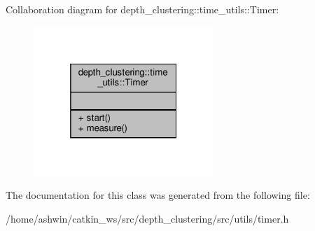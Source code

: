 Collaboration diagram for depth\+\_\+clustering\+:\+:time\+\_\+utils\+:\+:Timer\+:\nopagebreak
\begin{figure}[H]
\begin{center}
\leavevmode
\includegraphics[width=193pt]{classdepth__clustering_1_1time__utils_1_1Timer__coll__graph}
\end{center}
\end{figure}


The documentation for this class was generated from the following file\+:\begin{DoxyCompactItemize}
\item 
/home/ashwin/catkin\+\_\+ws/src/depth\+\_\+clustering/src/utils/timer.\+h\end{DoxyCompactItemize}
